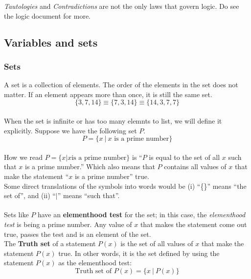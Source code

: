 \documentclass[../setup.tex]{subfiles}
\begin{document}
\begin{remark}
\textit{Tautologies} and \textit{Contradictions} are not the only laws that govern logic. Do see the logic document for more.
\end{remark}



\subsection{Variables and sets}
\subsubsection{Sets}
A set is a collection of elements. The order of the elements in the set does not matter. If an element appears more than once, it is still the same set. \\
\[ \{3, 7, 14\} \equiv \{7, 3, 14\} \equiv \{14, 3, 7, 7\} \]
\\
When the set is infinite or has too many elemnts to list, we will define it explicitly. Suppose we have the following set $P$. \\

\[ P = \{x \ |\  x \text{ is a prime number}\} \]
\\
How we read $P = \{x | x \text{is a prime number}\}$ is ``$P$ is equal to the set of all $x$ such that $x$ is a prime number.'' Which also means that $P$ contains all values of $x$ that make the statement ``$x$ is a prime number'' true. \\
Some direct translations of the symbols into words would be (i) ``\{\}'' means ``the set of'', and (ii) ``$|$'' means ``such that''. \\
\\
Sets like $P$ have an \textbf{elementhood test} for the set; in this case, the \textit{elementhood test} is being a prime number. Any value of $x$ that makes the statement come out true, passes the test and is an element of the set. \\
The \textbf{Truth set} of a statement $P(x)$ is the set of all values of $x$ that make the statement $P(x)$ true. In other words, it is the set defined by using the statement $P(x)$ as the elementhood test: \\
\[ \text{Truth set of } P(x) = \{x \ | \ P(x)\} \]
\end{document}
